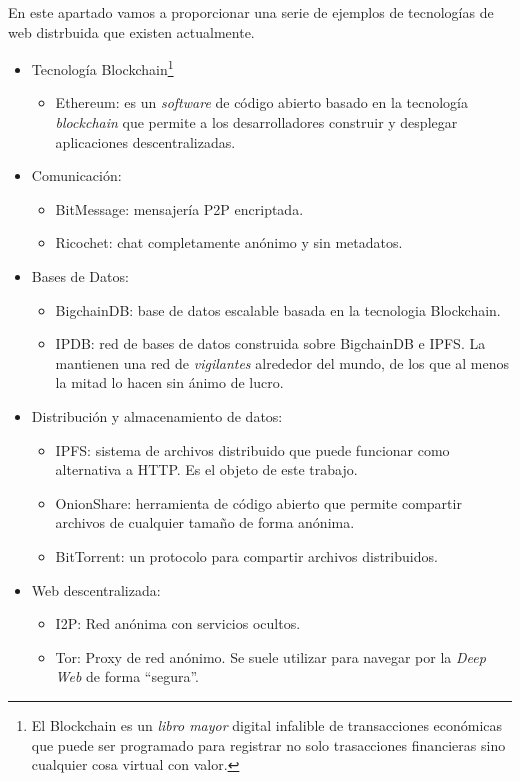 \documentclass[12pt]{article} %
\begin{document}
En este apartado vamos a proporcionar una serie de ejemplos de tecnologías de web distrbuida que existen actualmente.
\begin{itemize}
  \item Tecnología Blockchain\footnote{El Blockchain es un \textit{libro mayor} digital infalible de transacciones económicas que puede ser programado para registrar no solo trasacciones financieras sino cualquier cosa virtual con valor.\cite{blockchain-technology}}
  \begin{itemize}
    \item Ethereum: es un \textit{software} de código abierto basado en la tecnología \textit{blockchain} que permite a los desarrolladores construir y desplegar aplicaciones descentralizadas.
  \end{itemize}
  \item Comunicación:
  \begin{itemize}
    \item BitMessage: mensajería P2P encriptada.
    \item Ricochet: chat completamente anónimo y sin metadatos.
  \end{itemize}
  \item Bases de Datos:
  \begin{itemize}
    \item BigchainDB: base de datos escalable basada en la tecnologia Blockchain.
    \item IPDB: red de bases de datos construida sobre BigchainDB e IPFS. La mantienen una red de \textit{vigilantes} alrededor del mundo, de los que al menos la mitad lo hacen sin ánimo de lucro.
  \end{itemize}
  \item Distribución y almacenamiento de datos:
  \begin{itemize}
    \item IPFS: sistema de archivos distribuido que puede funcionar como alternativa a HTTP. Es el objeto de este trabajo.
    \item OnionShare: herramienta de código abierto que permite compartir archivos de cualquier tamaño de forma anónima.
    \item BitTorrent: un protocolo para compartir archivos distribuidos.
  \end{itemize}
  \item Web descentralizada:
    \begin{itemize}
      \item I2P: Red anónima con servicios ocultos.
      \item Tor: Proxy de red anónimo. Se suele utilizar para navegar por la \textit{Deep Web} de forma ``segura''.

\end{itemize}
\end{itemize}
\end{document}
